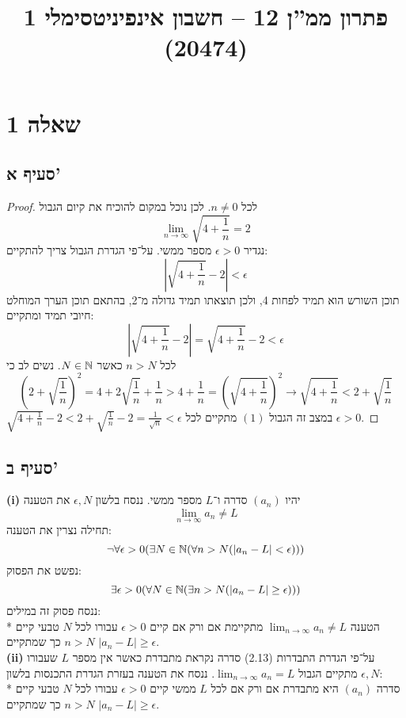 
\title{פתרון ממ''ן 12 – חשבון אינפיניטסימלי 1 (20474)}


\maketitle
\section{שאלה 1}
\subsection{סעיף א'}
\begin{proof}
	לכל $n \ne 0$. לכן נוכל במקום להוכיח את קיום הגבול
	\[
		\lim_{n \to \infty} \sqrt{4 + \frac{1}{n}} = 2
	\]
	נגדיר $\epsilon > 0$ מספר ממשי. על־פי הגדרת הגבול צריך להתקיים:
	\[
		\left| \sqrt{4 + \frac{1}{n}} - 2 \right| < \epsilon
	\]
	תוכן השורש הוא תמיד לפחות 4, ולכן תוצאתו תמיד גדולה מ־2, בהתאם תוכן הערך המוחלט חיובי תמיד ומתקיים:
	\[
		\left| \sqrt{4 + \frac{1}{n}} - 2 \right|
		= \sqrt{4 + \frac{1}{n}} - 2 < \epsilon
	\]
	לכל $n > N$ כאשר $N \in \mathbb{N}$. נשים לב כי
	\[
		{\left(2 + \sqrt{\frac{1}{n}}\right)}^2 = 4 + 2\sqrt{\frac{1}{n}} + \frac{1}{n} > 4 + \frac{1}{n} = {\left(\sqrt{4 + \frac{1}{n}}\right)}^2
		\rightarrow \sqrt{4 + \frac{1}{n}} < 2 + \sqrt{\frac{1}{n}}
	\]
	 {$\sqrt{4 + \frac{1}{n}} - 2 < 2 + \sqrt{\frac{1}{n}} - 2 = \frac{1}{\sqrt{n}} < \epsilon$ }
	במצב זה הגבול $(1)$ מתקיים לכל $\epsilon > 0$.
\end{proof}

\subsection{סעיף ב'}
\textbf{(i)}
יהיו $(a_n)$ סדרה ו־$L$ מספר ממשי. ננסח בלשון $\epsilon, N$ את הטענה
\[
	\lim_{n \to \infty} a_n \ne L
\]
תחילה נצרין את הטענה:
\[
	\lnot \forall \epsilon > 0 (
	\exists N \in \mathbb{N} (
	\forall n > N (\left| a_n - L \right| < \epsilon)))
\]
נפשט את הפסוק:
\[
	\exists \epsilon > 0 (
	\forall N \in \mathbb{N} (
	\exists n > N (\left| a_n - L \right| \ge \epsilon)))
\]
ננסח פסוק זה במילים: \\*
הטענה $\lim_{n \to \infty} a_n \ne L$ מתקיימת אם ורק אם
קיים $\epsilon > 0$ עבורו לכל $N$ טבעי קיים $n > N$
כך שמתקיים $\left| a_n - L \right| \ge \epsilon$. \\
\textbf{(ii)}
על־פי הגדרת התבדרות (2.13) סדרה נקראת מתבדרת כאשר אין מספר $L$
שעבורו מתקיים הגבול $\lim_{n \to \infty} a_n = L$.
ננסח את הטענה בעזרת הגדרת התכנסות בלשון $\epsilon, N$: \\*
סדרה $(a_n)$ היא מתבדרת אם ורק אם
לכל $L$ ממשי קיים $\epsilon > 0$ עבורו לכל $N$ טבעי קיים $n > N$
כך שמתקיים $\left| a_n - L \right| \ge \epsilon$.

